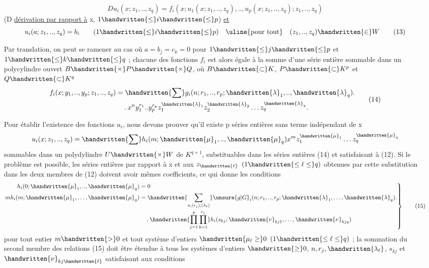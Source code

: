 
\[
Du_i(x;z_1,..,z_q)=f_i(x;u_1(x;z_1,..,z_q),..,u_p(x;z_1,..,z_q);z_1,..,z_q)\tag*{(12)}
\]
(D \uline{dérivation par rapport à} x, $1\handwritten{\leq}i\handwritten{\leq}p$) \uline{et}
\[
u_i(a;z_1,..,z_q)=b_i\qquad(1\handwritten{\leq}i\handwritten{\leq}p)\quad\text{\uline{pour tout}}\quad(z_1,..,z_q)\handwritten{\in}W\tag*{(13)}
\]

Par translation, on peut se ramener au cas où $a=b_j=c_k=0$ pour $1\handwritten{\leq}j\handwritten{\leq}p$ et $1\handwritten{\leq}k\handwritten{\leq}q$ ; chacune des fonctions $f_i$ est alors égale à la somme d'une série entière sommable dans un polycylindre ouvert $B\handwritten{\times}P\handwritten{\times}Q$, où $B\handwritten{\subset}K$, $P\handwritten{\subset}K^p$ et $Q\handwritten{\subset}K^q$
\[
\begin{aligned}
f_i(x;y_1,..,y_p;z_1,..,z_q)&=\handwritten{\sum}g_i(n;r_1,..,r_p;\handwritten{\lambda}_1,..,\handwritten{\lambda}_q)\mathbin{.}\\
&\quad\mathbin{.}x^n y_1^{r_1}..y_p^{r_p}z_1^{\handwritten{\lambda}_1}z_2^{\handwritten{\lambda}_2}\ldots z_q^{\handwritten{\lambda}_q}.
\end{aligned}\tag*{(14)}
\]

Pour établir l'existence des fonctions $u_i$, nous devons prouver qu'il existe p séries entières sans terme indépendant de x
\[
u_i(x;z_1,..,z_q)=\handwritten{\sum}h_i(m;\handwritten{\mu}_1,..,\handwritten{\mu}_q)x^m z_1^{\handwritten{\mu}_1}\ldots z_q^{\handwritten{\mu}_q}
\]
sommables dans un polydylindre $U\handwritten{\times}W$ de $K^{q+1}$, substituables dans les séries entières (14) et satisfaisant à (12). Si le problème est possible, les séries entières par rapport à x et aux $z_{\handwritten{\ell}}$ $(1\handwritten{\leq\ell\leq}q)$ obtenues par cette substitution dans les deux membres de (12) doivent avoir mêmes coefficients, ce qui donne les conditions
\[
\left.\begin{aligned}
h_i(0;\handwritten{\mu}_1,..,\handwritten{\mu}_q)&=0\\
mh_i(m;\handwritten{\mu}_1,\ldots,\handwritten{\mu}_q)&=\handwritten{\sum_{n,(r_j),(\lambda_\ell)}}\unsure{g|G}_i(n;r_1,..,r_p;\handwritten{\lambda}_1,\ldots,\handwritten{\lambda}_q)\mathbin{.}\\
&\quad\mathbin{.}\handwritten{\prod_{j=1}^p\prod_{k=1}^{r_j}}h_i(s_{kj};\handwritten{\nu}_{kj1},\ldots,\handwritten{\nu}_{kjq})
\end{aligned}\right\}\tag*{(15)}
\]
pour tout entier $m\handwritten{>}0$ et tout système d'entiers $\handwritten{\mu_\ell\geq}0$ $(1\handwritten{\leq\ell\leq}q)$ ; la sommation du second membre des relations (15) doit être étendue à tous les systèmes d'entiers $\handwritten{\geq}0$, $n,r_j,\handwritten{\lambda_\ell}$, $s_{kj}$ et $\handwritten{\nu}_{kj\handwritten{\ell}}$ satisfaisa\handwritten{-}nt aux conditions


